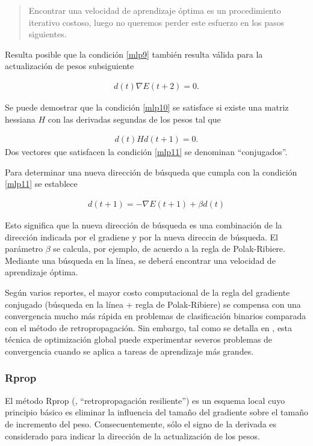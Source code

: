 \begin{quote}
  Encontrar una velocidad de aprendizaje óptima es un procedimiento
  iterativo costoso, luego no queremos perder este esfuerzo en los
  pasos siguientes.
\end{quote}

Resulta posible que la condición \autoref{mlp9} también resulta válida
para la actualización de pesos subsiguiente

\begin{align}
\label{mlp10}
  d(t)\nabla{}E(t+2)=0.
\end{align}

Se puede demostrar que la condición \autoref{mlp10} se satisface si existe
una matriz hessiana $H$ con las derivadas segundas de los pesos tal
que

\begin{align}
\label{mlp11}
  d(t) H d(t+1) =0.
\end{align}
Dos vectores que satisfacen la condición \autoref{mlp11} se denominan
``conjugados''.

Para determinar una nueva dirección de búsqueda que cumpla con la
condición \autoref{mlp11} se establece

\begin{align*}
  d(t+1) = -\nabla{}E(t+1)+\beta d(t)
\end{align*}

Esto significa que la nueva dirección de búsqueda es una combinación
de la dirección indicada por el gradiene y por la nueva direccin de
búsqueda. El parámetro $\beta$ se calcula, por ejemplo, de acuerdo a
la regla de Polak-Ribiere. Mediante una búsqueda en la línea, se
deberá encontrar una velocidad de aprendizaje óptima.

Según varios reportes, el mayor costo computacional de la regla del
gradiente conjugado (búsqueda en la línea + regla de Polak-Ribiere) se
compensa con una convergencia mucho más rápida en problemas de
clasificación binarios comparada con el método de
retropropagación. Sin embargo, tal como se detalla en
\cite{schiffmann}, esta técnica de optimización global puede
experimentar severos problemas de convergencia cuando se aplica a
tareas de aprendizaje más grandes.

\subsubsection{Rprop}
El método Rprop (, ``retropropagación
resiliente'') \cite{rprop} es un esquema local cuyo principio básico
es eliminar la influencia del tamaño del gradiente sobre el
tamaño de incremento del peso. Consecuentemente, sólo el signo de la
derivada es considerado para indicar la dirección de la actualización
de los pesos.

